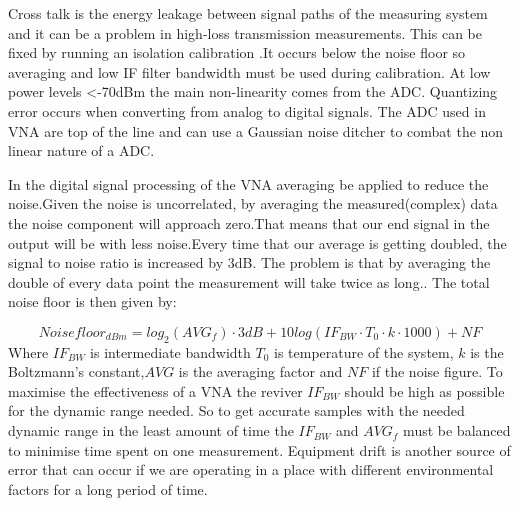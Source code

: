 Cross talk is the energy leakage between signal paths of the measuring system and it can be a problem in high-loss transmission measurements. This can be fixed by running an isolation calibration \citep{crosstalk}.It occurs below the noise floor so averaging and low \gls{IF} filter bandwidth must be used during calibration.
At low power levels <-70dBm the main non-linearity comes from the \gls{ADC}. Quantizing error occurs when converting from analog to digital signals. The \gls{ADC} used in \gls{VNA} are top of the line and can use a Gaussian noise ditcher to combat the non linear nature of a \gls{ADC}. 


In the digital signal processing of the \gls{VNA} averaging be applied to reduce the noise.Given the noise is uncorrelated, by averaging the measured(complex) data the noise component will approach zero.That means that our end signal in the output will be with less noise.Every time that our average is getting doubled, the signal to noise ratio is increased by 3dB. The problem is that by averaging the double of every data point the measurement will take twice as long.\citep{KeysightAVG}. The total noise floor is then given by:

\begin{equation}
Noisefloor_{dBm} = log_{2}(AVG_f)\cdot 3dB +10log(IF_{BW}\cdot T_{0}\cdot k\cdot 1000) + NF
\label{NFwithAVG}
\end{equation}
Where $IF_{BW}$ is  intermediate bandwidth $T_0$ is temperature of the system, $k$ is the Boltzmann's constant,$AVG$ is the averaging factor and $NF$ if the noise figure.
To maximise the effectiveness of a \gls{VNA} the reviver $IF_{BW}$ should be high as possible for the dynamic range needed. So to get accurate samples with the needed dynamic range in the least amount of time the $IF_{BW}$ and $AVG_f$ must be balanced to minimise time spent on one measurement.
Equipment drift is another source of error that can occur if we are operating in a place with different environmental factors for a long period of time.


